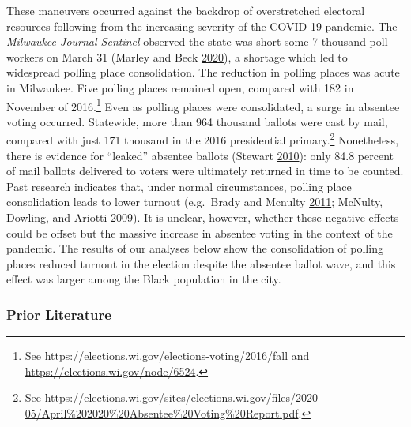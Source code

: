 \documentclass[
  12pt,
]{article}
\begin{document}
These maneuvers occurred against the backdrop of overstretched electoral resources following from the increasing severity of the COVID-19 pandemic. The \emph{Milwaukee Journal Sentinel} observed the state was short some 7 thousand poll workers on March 31 (Marley and Beck \protect\hyperlink{ref-Marley2020}{2020}), a shortage which led to widespread polling place consolidation. The reduction in polling places was acute in Milwaukee. Five polling places remained open, compared with 182 in November of 2016.\footnote{See \url{https://elections.wi.gov/elections-voting/2016/fall} and \url{https://elections.wi.gov/node/6524}.} Even as polling places were consolidated, a surge in absentee voting occurred. Statewide, more than 964 thousand ballots were cast by mail, compared with just 171 thousand in the 2016 presidential primary.\footnote{See \url{https://elections.wi.gov/sites/elections.wi.gov/files/2020-05/April\%202020\%20Absentee\%20Voting\%20Report.pdf}.} Nonetheless, there is evidence for ``leaked'' absentee ballots (Stewart \protect\hyperlink{ref-Stewart2010}{2010}): only 84.8 percent of mail ballots delivered to voters were ultimately returned in time to be counted. Past research indicates that, under normal circumstances, polling place consolidation leads to lower turnout (e.g.~Brady and Mcnulty \protect\hyperlink{ref-Brady2011}{2011}; McNulty, Dowling, and Ariotti \protect\hyperlink{ref-McNulty2009}{2009}). It is unclear, however, whether these negative effects could be offset but the massive increase in absentee voting in the context of the pandemic. The results of our analyses below show the consolidation of polling places reduced turnout in the election despite the absentee ballot wave, and this effect was larger among the Black population in the city.

\hypertarget{prior-literature}{%
\subsubsection*{Prior Literature}\label{prior-literature}}
\end{document}
